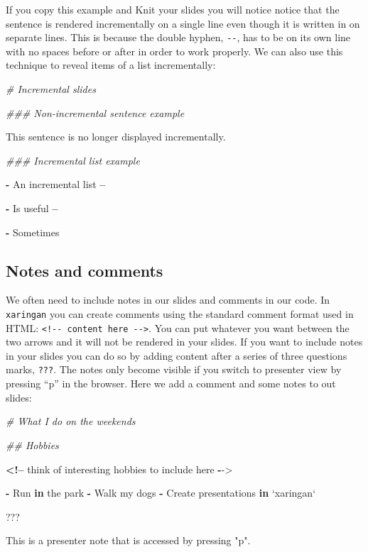 \documentclass[
]{book}
\newenvironment{Shaded}{\begin{snugshade}}{\end{snugshade}}
\newcommand{\CommentTok}[1]{\textcolor[rgb]{0.37,0.37,0.37}{\textit{#1}}}
\newcommand{\ControlFlowTok}[1]{\textcolor[rgb]{0.27,0.27,0.27}{\textbf{#1}}}
\newcommand{\DataTypeTok}[1]{\textcolor[rgb]{0.27,0.27,0.27}{#1}}
\newcommand{\NormalTok}[1]{#1}
\newcommand{\OperatorTok}[1]{\textcolor[rgb]{0.43,0.43,0.43}{\textbf{#1}}}
\newcommand{\StringTok}[1]{\textcolor[rgb]{0.5,0.5,0.5}{#1}}
\begin{document}
If you copy this example and Knit your slides you will notice notice that the sentence is rendered incrementally on a single line even though it is written in on separate lines. This is because the double hyphen, \texttt{-\/-}, has to be on its own line with no spaces before or after in order to work properly. We can also use this technique to reveal items of a list incrementally:

\begin{Shaded}
\begin{Highlighting}[]
\CommentTok{# Incremental slides}

\CommentTok{### Non-incremental sentence example}

\NormalTok{This sentence is no longer displayed incrementally. }

\CommentTok{### Incremental list example}

\OperatorTok{-}\StringTok{ }\NormalTok{An incremental list}
\OperatorTok{--}

\OperatorTok{-}\StringTok{ }\NormalTok{Is useful}
\OperatorTok{--}

\OperatorTok{-}\StringTok{ }\NormalTok{Sometimes}
\end{Highlighting}
\end{Shaded}

\hypertarget{notes-and-comments}{%
\subsection{Notes and comments}\label{notes-and-comments}}

We often need to include notes in our slides and comments in our code. In \texttt{xaringan} you can create comments using the standard comment format used in HTML: \texttt{\textless{}!-\/-\ content\ here\ -\/-\textgreater{}}. You can put whatever you want between the two arrows and it will not be rendered in your slides. If you want to include notes in your slides you can do so by adding content after a series of three questions marks, \texttt{???}. The notes only become visible if you switch to presenter view by pressing ``p'' in the browser. Here we add a comment and some notes to out slides:

\begin{Shaded}
\begin{Highlighting}[]
\CommentTok{# What I do on the weekends}

\CommentTok{## Hobbies}

\OperatorTok{<!--}\StringTok{ }\NormalTok{think of interesting hobbies to include here }\OperatorTok{-}\NormalTok{->}

\OperatorTok{-}\StringTok{ }\NormalTok{Run }\ControlFlowTok{in}\NormalTok{ the park }
\OperatorTok{-}\StringTok{ }\NormalTok{Walk my dogs }
\OperatorTok{-}\StringTok{ }\NormalTok{Create presentations }\ControlFlowTok{in} \StringTok{`}\DataTypeTok{xaringan}\StringTok{`}

\NormalTok{???}

\NormalTok{This is a presenter note that is accessed by pressing }\StringTok{"p"}\NormalTok{.}
\end{Highlighting}
\end{Shaded}
\end{document}
